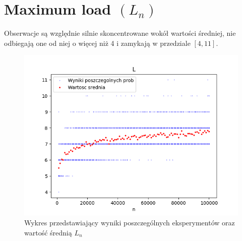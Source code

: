 \documentclass{report}
\begin{document}
\section*{Maximum load \((L_n)\)}
\justifying
Obserwacje są względnie silnie skoncentrowane wokół wartości średniej,
nie odbiegają one od niej o więcej niż 4 i zamykają w przedziale \([4,11]\).
    \begin{figure}[htp]
        \centering
        \includegraphics[scale=0.7]{plotL.png}
        \caption[Example .]{Wykres przedstawiający wyniki poszczególnych eksperymentów oraz wartość średnią \(L_{n}\)}
        \label{plotL}
    \end{figure}
\end{document}
